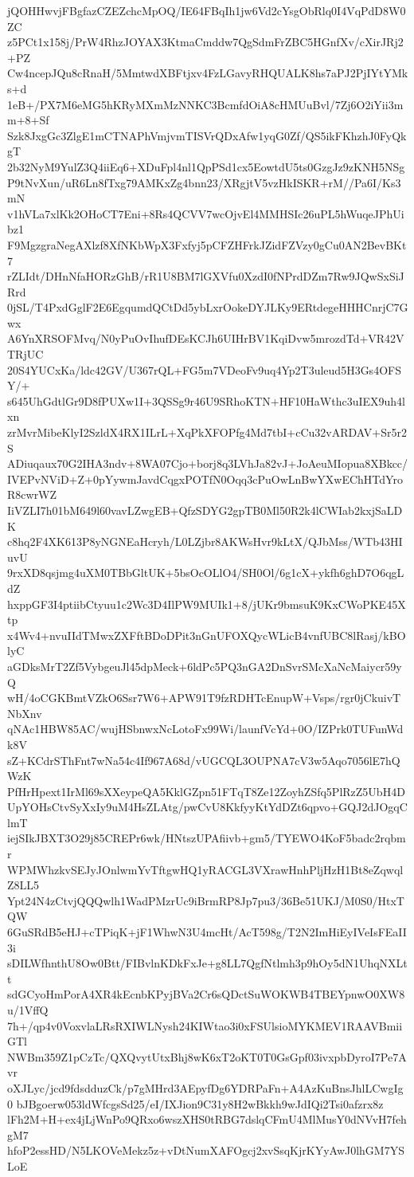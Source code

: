 jQOHHwvjFBgfazCZEZchcMpOQ/IE64FBqIh1jw6Vd2cYsgObRlq0I4VqPdD8W0ZC
z5PCt1x158j/PrW4RhzJOYAX3KtmaCmddw7QgSdmFrZBC5HGnfXv/cXirJRj2+PZ
Cw4ncepJQu8cRnaH/5MmtwdXBFtjxv4FzLGavyRHQUALK8hs7aPJ2PjIYtYMks+d
1eB+/PX7M6eMG5hKRyMXmMzNNKC3BcmfdOiA8cHMUuBvl/7Zj6O2iYii3mm+8+Sf
Szk8JxgGc3ZlgE1mCTNAPhVmjvmTISVrQDxAfw1yqG0Zf/QS5ikFKhzhJ0FyQkgT
2b32NyM9YulZ3Q4iiEq6+XDuFpl4nl1QpPSd1cx5EowtdU5ts0GzgJz9zKNH5NSg
P9tNvXun/uR6Ln8fTxg79AMKxZg4bnn23/XRgjtV5vzHkISKR+rM//Pa6I/Ks3mN
v1hVLa7xlKk2OHoCT7Eni+8Rs4QCVV7wcOjvEl4MMHSIc26uPL5hWuqeJPhUibz1
F9MgzgraNegAXlzf8XfNKbWpX3Fxfyj5pCFZHFrkJZidFZVzy0gCu0AN2BevBKt7
rZLIdt/DHnNfaHORzGhB/rR1U8BM7lGXVfu0XzdI0fNPrdDZm7Rw9JQwSxSiJRrd
0jSL/T4PxdGglF2E6EgqumdQCtDd5ybLxrOokeDYJLKy9ERtdegeHHHCnrjC7Gwx
A6YnXRSOFMvq/N0yPuOvIhufDEsKCJh6UIHrBV1KqiDvw5mrozdTd+VR42VTRjUC
20S4YUCxKa/ldc42GV/U367rQL+FG5m7VDeoFv9uq4Yp2T3uleud5H3Gs4OFSY/+
s645UhGdtlGr9D8fPUXw1I+3QSSg9r46U9SRhoKTN+HF10HaWthc3uIEX9uh4lxn
zrMvrMibeKlyI2SzldX4RX1ILrL+XqPkXFOPfg4Md7tbI+cCu32vARDAV+Sr5r2S
ADiuqaux70G2IHA3ndv+8WA07Cjo+borj8q3LVhJa82vJ+JoAeuMIopua8XBkcc/
IVEPvNViD+Z+0pYywmJavdCqgxPOTfN0Oqq3cPuOwLnBwYXwEChHTdYroR8cwrWZ
IiVZLI7h01bM649l60vavLZwgEB+QfzSDYG2gpTB0Ml50R2k4lCWIab2kxjSaLDK
c8hq2F4XK613P8yNGNEaHcryh/L0LZjbr8AKWsHvr9kLtX/QJbMss/WTb43HIuvU
9rxXD8qsjmg4uXM0TBbGltUK+5bsOcOLlO4/SH0Ol/6g1cX+ykfh6ghD7O6qgLdZ
hxppGF3I4ptiibCtyuu1c2Wc3D4IlPW9MUIk1+8/jUKr9bmsuK9KxCWoPKE45Xtp
x4Wv4+nvuIIdTMwxZXFftBDoDPit3nGnUFOXQycWLicB4vnfUBC8lRasj/kBOlyC
aGDksMrT2Zf5VybgeuJl45dpMeck+6ldPc5PQ3nGA2DnSvrSMcXaNcMaiycr59yQ
wH/4oCGKBmtVZkO6Ssr7W6+APW91T9fzRDHTcEnupW+Vsps/rgr0jCkuivTNbXnv
qNAc1HBW85AC/wujHSbnwxNcLotoFx99Wi/launfVcYd+0O/IZPrk0TUFunWdk8V
sZ+KCdrSThFnt7wNa54c4If967A68d/vUGCQL3OUPNA7cV3w5Aqo7056lE7hQWzK
PfHrHpext1IrMl69sXXeypeQA5KklGZpn51FTqT8Ze12ZoyhZSfq5PlRzZ5UbH4D
UpYOHsCtvSyXxIy9uM4HsZLAtg/pwCvU8KkfyyKtYdDZt6qpvo+GQJ2dJOgqClmT
iejSIkJBXT3O29j85CREPr6wk/HNtszUPAfiivb+gm5/TYEWO4KoF5badc2rqbmr
WPMWhzkvSEJyJOnlwmYvTftgwHQ1yRACGL3VXrawHnhPljHzH1Bt8eZqwqlZ8LL5
Ypt24N4zCtvjQQQwlh1WadPMzrUc9iBrmRP8Jp7pu3/36Be51UKJ/M0S0/HtxTQW
6GuSRdB5eHJ+cTPiqK+jF1WhwN3U4mcHt/AcT598g/T2N2ImHiEyIVeIsFEaII3i
sDILWfhnthU8Ow0Btt/FIBvlnKDkFxJe+g8LL7QgfNtlmh3p9hOy5dN1UhqNXLtt
sdGCyoHmPorA4XR4kEcnbKPyjBVa2Cr6sQDctSuWOKWB4TBEYpnwO0XW8u/1VffQ
7h+/qp4v0VoxvlaLRsRXIWLNysh24KIWtao3i0xFSUlsioMYKMEV1RAAVBmiiGTl
NWBm359Z1pCzTc/QXQvytUtxBhj8wK6xT2oKT0T0GsGpf03ivxpbDyroI7Pe7Avr
oXJLyc/jcd9fdsdduzCk/p7gMHrd3AEpyfDg6YDRPaFn+A4AzKuBnsJhlLCwgIg0
bJBgoerw053ldWfcgsSd25/eI/IXJion9C31y8H2wBkkh9wJdIQi2Tsi0afzrx8z
lFh2M+H+ex4jLjWnPo9QRxo6wszXHS0tRBG7dslqCFmU4MlMusY0dNVvH7fehgM7
hfoP2essHD/N5LKOVeMekz5z+vDtNumXAFOgcj2xvSsqKjrKYyAwJ0lhGM7YSLoE
